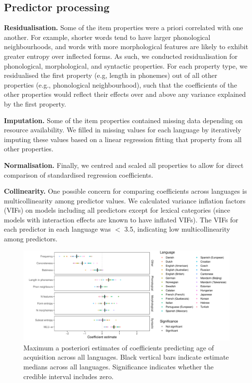 \documentclass[10pt, letterpaper]{article}
\newenvironment{CodeChunk}{}{}
\begin{document}
\hypertarget{predictor-processing}{%
\subsection{Predictor processing}\label{predictor-processing}}

\textbf{Residualisation.} Some of the item properties were a priori
correlated with one another. For example, shorter words tend to have
larger phonological neighbourhoods, and words with more morphological
features are likely to exhibit greater entropy over inflected forms. As
such, we conducted residualisation for phonological, morphological, and
syntactic properties. For each property type, we residualised the first
property (e.g, length in phonemes) out of all other properties (e.g.,
phonological neighbourhood), such that the coefficients of the other
properties would reflect their effects over and above any variance
explained by the first property.

\textbf{Imputation.} Some of the item properties contained missing data
depending on resource availability. We filled in missing values for each
language by iteratively imputing these values based on a linear
regression fitting that property from all other properties.

\textbf{Normalisation.} Finally, we centred and scaled all properties to
allow for direct comparison of standardised regression coefficients.

\textbf{Collinearity.} One possible concern for comparing coefficients
across languages is multicollinearity among predictor values. We
calculated variance inflation factors (VIFs) on models including all
predictors except for lexical categories (since models with interaction
effects are known to have inflated VIFs). The VIFs for each predictor in
each language was \(<\) 3.5, indicating low multicollinearity among
predictors.

\begin{CodeChunk}
\begin{figure}[ht]

{\centering \includegraphics[width=500px]{figs/big_plot-1} 

}

\caption[Maximum a posteriori estimates of coefficients predicting age of acquisition across all languages]{Maximum a posteriori estimates of coefficients predicting age of acquisition across all languages. Black vertical bars indicate estimate medians across all languages. Significance indicates whether the credible interval includes zero.}\label{fig:big_plot}
\end{figure}
\end{CodeChunk}
\end{document}

